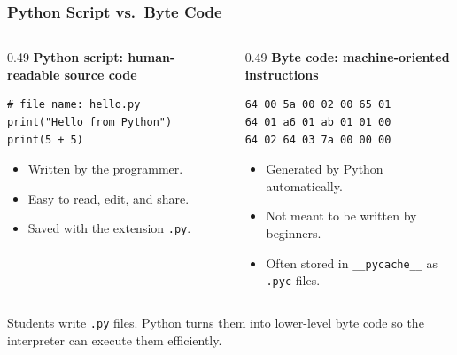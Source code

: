 \documentclass[aspectratio=169,10pt]{beamer}
\begin{document}
\begin{frame}[fragile]
\frametitle{Python Script vs.\ Byte Code}
\vspace{-0.05cm}
\begin{columns}[T,totalwidth=\textwidth]
\begin{column}{0.49\textwidth}
\textbf{Python script: human-readable source code}
\begin{lstlisting}[style=pycodelarge,basicstyle=\ttfamily\normalsize]
# file name: hello.py
print("Hello from Python")
print(5 + 5)
\end{lstlisting}
\begin{itemize}\setlength\itemsep{0.1cm}
\item Written by the programmer.
\item Easy to read, edit, and share.
\item Saved with the extension \texttt{.py}.
\end{itemize}
\end{column}
\begin{column}{0.49\textwidth}
\textbf{Byte code: machine-oriented instructions}
\begin{lstlisting}[style=termcode,basicstyle=\ttfamily\normalsize]
64 00 5a 00 02 00 65 01
64 01 a6 01 ab 01 01 00
64 02 64 03 7a 00 00 00
\end{lstlisting}
\begin{itemize}\setlength\itemsep{0.1cm}
\item Generated by Python automatically.
\item Not meant to be written by beginners.
\item Often stored in \texttt{\_\_pycache\_\_} as \texttt{.pyc} files.
\end{itemize}
\end{column}
\end{columns}
\begin{tcolorbox}[lecturebox,title=Key idea]
Students write \texttt{.py} files. Python turns them into lower-level byte code so the interpreter can execute them efficiently.
\end{tcolorbox}
\end{frame}
\end{document}
